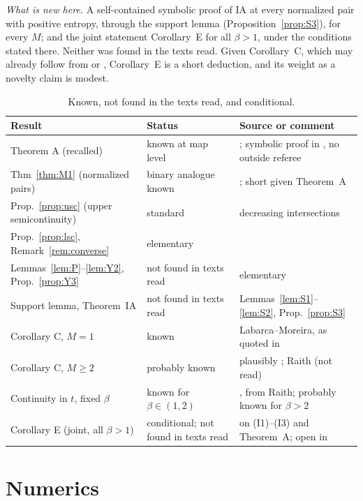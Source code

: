 \documentclass[11pt]{amsart}
\theoremstyle{definition}
\theoremstyle{remark}
\begin{document}
\emph{What is new here.} A self-contained symbolic proof of IA at every normalized pair with positive entropy, through the support lemma (Proposition~\ref{prop:S3}), for every $M$; and the joint statement Corollary~E for all $\beta>1$, under the conditions stated there. Neither was found in the texts read. Given Corollary~C, which may already follow from \cite{BR} or \cite{Raith94}, Corollary~E is a short deduction, and its weight as a novelty claim is modest.

\begin{table}[h]
\centering\small
\begin{tabular}{p{4.6cm}p{3.6cm}p{6.0cm}}
\toprule
Result & Status & Source or comment\\
\midrule
Theorem A (recalled) & known at map level & \cite{Oliveira}; symbolic proof in \cite{Nem26}, no outside referee\\
Thm~\ref{thm:M1} (normalized pairs) & binary analogue known & \cite[Lemma~3.6]{LSZ}; short given Theorem~A\\
Prop.~\ref{prop:usc} (upper semicontinuity) & standard & decreasing intersections\\
Prop.~\ref{prop:lsc}, Remark~\ref{rem:converse} & elementary & \\
Lemmas~\ref{lem:P}--\ref{lem:Y2}, Prop.~\ref{prop:Y3} & not found in texts read & elementary\\
Support lemma, Theorem~IA & not found in texts read & Lemmas~\ref{lem:S1}--\ref{lem:S2}, Prop.~\ref{prop:S3}\\
Corollary C, $M=1$ & known & Labarca--Moreira, as quoted in \cite{LSZ}\\
Corollary C, $M\ge2$ & probably known & plausibly \cite[Thm.~1.2]{BR}; Raith (not read)\\
Continuity in $t$, fixed $\beta$ & known for $\beta\in(1,2)$ & \cite[Prop.~2.5]{KKLL}, from Raith; probably known for $\beta>2$\\
Corollary E (joint, all $\beta>1$) & conditional; not found in texts read & on (I1)--(I3) and Theorem~A; open in \cite[Remark~1.2]{AKgen}\\
\bottomrule
\end{tabular}
\caption{Known, not found in the texts read, and conditional.}
\end{table}

\section{Numerics}\label{sec:numerics}
\end{document}
